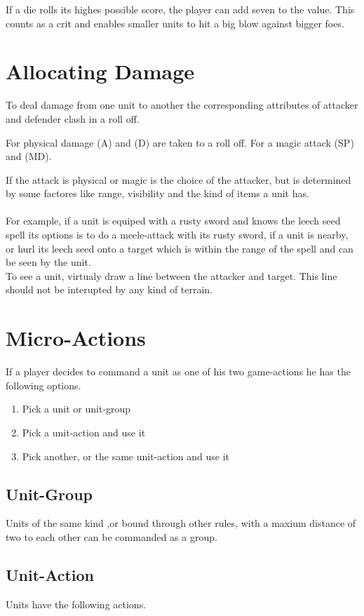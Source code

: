\documentclass[a5paper,pagesize,10pt,bibtotoc,pointlessnumbers,
normalheadings,DIV=9,twoside=false]{scrbook}
\begin{document}
If a die rolls its highes possible score, the player can add seven to the value. This counts as a crit and enables smaller units to hit a big blow against bigger foes.

\section{Allocating Damage}
To deal damage from one unit to another the corresponding attributes of attacker and defender clash in a roll off.

For physical damage (A) and (D) are taken to a roll off. For a magic attack (SP) and (MD).

If the attack is physical or magic is the choice of the attacker, but is determined by some factores like range, visibility and the kind of items a unit has.\\
\\
For example, if a unit is equiped with a rusty sword and knows the leech seed spell its options is to do a meele-attack with its rusty sword, if a unit is nearby, or hurl its leech seed onto a target which is within the range of the spell and can be seen by the unit.\\
To see a unit, virtualy draw a line between the attacker and target. This line should not be interupted by any kind of terrain.

\section{Micro-Actions}
If a player decides to command a unit as one of his two game-actions he has the following options.

\begin{enumerate}
\item Pick a unit or unit-group
\item Pick a unit-action and use it
\item Pick another, or the same unit-action and use it
\end{enumerate}

\subsection{Unit-Group}
Units of the same kind ,or bound through other rules, with a maxium distance of two to each other can be commanded as a group.

\subsection{Unit-Action}
Units have the following actions.
\end{document}
